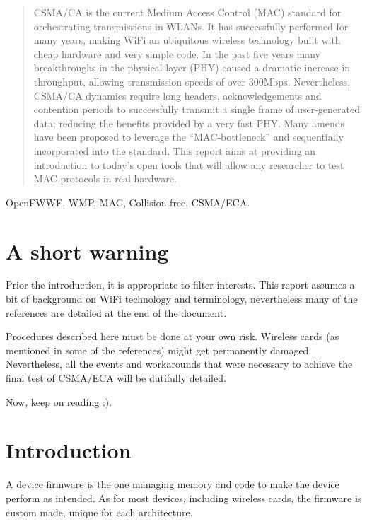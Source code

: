 \documentclass[conference]{IEEEtran}
\begin{document}
\begin{abstract}

\boldmath CSMA/CA is the current Medium Access Control (MAC) standard for orchestrating transmissions in WLANs. It has successfully performed for many years, making WiFi an ubiquitous wireless technology built with cheap hardware and very simple code. In the past five years many breakthroughs in the physical layer (PHY) caused a dramatic increase in throughput, allowing transmission speeds of over 300Mbps. Nevertheless, CSMA/CA dynamics require long headers, acknowledgements and contention periods to successfully transmit a single frame of user-generated data; reducing the benefits provided by a very fast PHY. Many amends have been proposed to leverage the ``MAC-bottleneck'' and sequentially incorporated into the standard. This report aims at providing an introduction to today's open tools that will allow any researcher to test MAC protocols in real hardware.

\end{abstract}

\begin{IEEEkeywords}
OpenFWWF, WMP, MAC, Collision-free, CSMA/ECA.
\end{IEEEkeywords}

\section*{A short warning} \label{warning}
Prior the introduction, it is appropriate to filter interests. This report assumes a bit of background on WiFi technology and terminology, nevertheless many of the references are detailed at the end of the document.

Procedures described here must be done at your own risk. Wireless cards (as mentioned in some of the references) might get permanently damaged. Nevertheless, all the events and workarounds that were necessary to achieve the final test of CSMA/ECA will be dutifully detailed.

Now, keep on reading :).

\section{Introduction}\label{introduction}
A device firmware is the one managing memory and code to make the device perform as intended. As for most devices, including wireless cards, the firmware is custom made, unique for each architecture.
\end{document}

